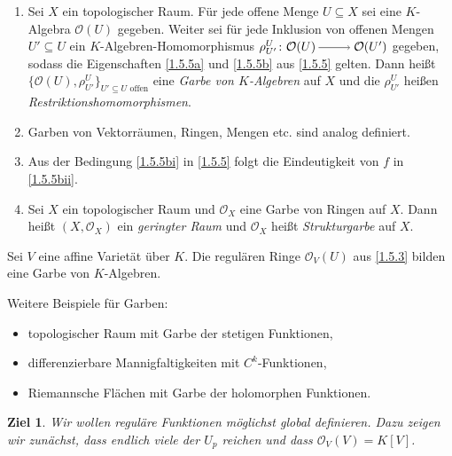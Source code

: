 \documentclass[a4paper,12pt,index=toc]{scrbook}
\theoremstyle{keinenummern} %
\newtheorem{ziel}{Ziel}
\def\O{\mathcal{O}}
\begin{document}
\begin{dfn}\label{1.5.6}
  \begin{enumerate}
  \item Sei $X$ ein topologischer Raum. Für jede offene Menge $U\subseteq X$ sei eine $K$-Algebra $\O(U)$ gegeben. Weiter sei
    für jede Inklusion von offenen Mengen $U'\subseteq U$ ein $K$-Algebren-Homomorphismus $\rho^{U}_{U'}\colon\O(U)\ra\O(U')$
    gegeben, sodass die Eigenschaften \ref{1.5.5a} und \ref{1.5.5b} aus \cref{1.5.5} gelten. Dann heißt
    $\{\O(U),\rho^{U}_{U'}\}_{U'\subseteq U\text{ offen}}$ eine \emph{Garbe von $K$-Algebren} auf $X$ und die $\rho^{U}_{U'}$ heißen
    \emph{Restriktionshomomorphismen}.
  \item Garben von Vektorräumen, Ringen, Mengen etc. sind analog definiert.
  \item Aus der Bedingung \ref{1.5.5bi} in \cref{1.5.5} folgt die Eindeutigkeit von $f$ in \ref{1.5.5bii}.
  \item Sei $X$ ein topologischer Raum und $\O_X$ eine Garbe von Ringen auf $X$. Dann heißt $(X,\O_X)$ ein \emph{geringter Raum}
    und $\O_X$ heißt \emph{Strukturgarbe} auf $X$.
  \end{enumerate}
\end{dfn}

\begin{bem}\label{1.5.7}
  Sei $V$ eine affine Varietät über $K$. Die regulären Ringe $\O_V(U)$ aus \cref{1.5.3} bilden eine Garbe von $K$-Algebren.
\end{bem}

\begin{bsp}\label{1.5.8}
  Weitere Beispiele für Garben:
  \begin{itemize}
  \item topologischer Raum mit Garbe der stetigen Funktionen,
  \item differenzierbare Mannigfaltigkeiten mit $C^k$-Funktionen,
  \item Riemannsche Flächen mit Garbe der holomorphen Funktionen.
  \end{itemize}
\end{bsp}

\begin{ziel} Wir wollen reguläre Funktionen möglichst global definieren.
Dazu zeigen wir zunächst, dass endlich viele der $U_p$ reichen
und dass $\O_V(V)=K[V]$.
\end{ziel}
\end{document}

